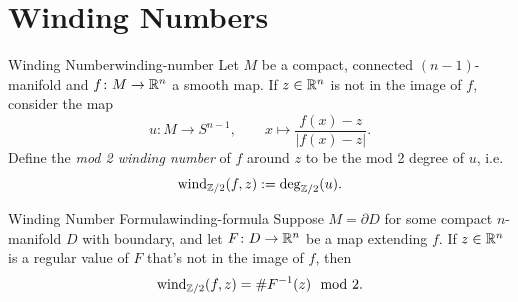 
\section{Winding Numbers}

\begin{definition}{Winding Number}{winding-number}
    Let $M$ be a compact, connected $(n-1)$-manifold and $f \colon M \to \mathbb{R}^n$ a smooth map. If $z \in \mathbb{R}^n$ is not in the image of $f$, consider the map
    \[
        u \colon M \to S^{n-1}, \qquad x \mapsto \frac{f(x) - z}{|f(x) - z|}.
    \]
    Define the \emph{mod 2 winding number} of $f$ around $z$ to be the mod 2 degree of $u$, i.e.
    \[
        \operatorname{wind}_{\mathbb{Z}/2}(f, z) := \deg_{\mathbb{Z}/2}(u).
    \]
\end{definition}

\begin{center}
\end{center}

\begin{theorem}{Winding Number Formula}{winding-formula}
    Suppose $M = \partial D$ for some compact $n$-manifold $D$ with boundary, and let $F \colon D \to \mathbb{R}^n$ be a map extending $f$. If $z \in \mathbb{R}^n$ is a regular value of $F$ that's not in the image of $f$, then
    \[
        \operatorname{wind}_{\mathbb{Z}/2}(f, z) = \# F^{-1}(z) \mod 2.
    \]
\end{theorem}

